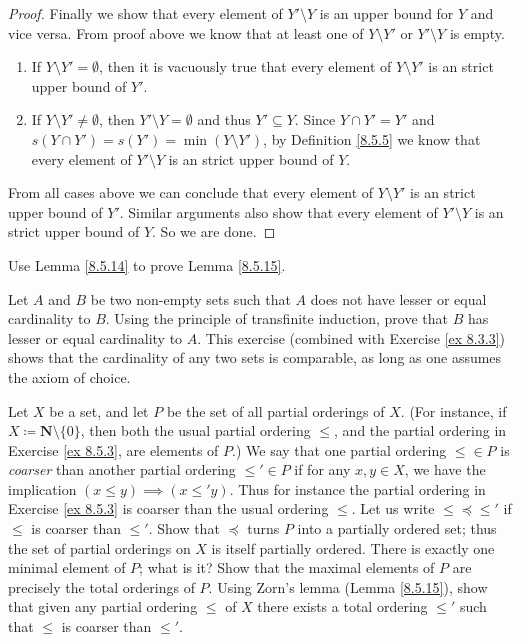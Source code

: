 \begin{proof}
    Finally we show that every element of \(Y' \setminus Y\) is an upper bound for \(Y\) and vice versa.
    From proof above we know that at least one of \(Y \setminus Y'\) or \(Y' \setminus Y\) is empty.
    \begin{enumerate}
        \item If \(Y \setminus Y' = \emptyset\), then it is vacuously true that every element of \(Y \setminus Y'\) is an strict upper bound of \(Y'\).
        \item If \(Y \setminus Y' \neq \emptyset\), then \(Y' \setminus Y = \emptyset\) and thus \(Y' \subseteq Y\).
              Since \(Y \cap Y' = Y'\) and \(s(Y \cap Y') = s(Y') = \min(Y \setminus Y')\), by Definition \ref{8.5.5} we know that every element of \(Y' \setminus Y\) is an strict upper bound of \(Y\).
    \end{enumerate}
    From all cases above we can conclude that every element of \(Y \setminus Y'\) is an strict upper bound of \(Y'\).
    Similar arguments also show that every element of \(Y' \setminus Y\) is an strict upper bound of \(Y\).
    So we are done.
\end{proof}

\begin{exercise}\label{ex 8.5.14}
    Use Lemma \ref{8.5.14} to prove Lemma \ref{8.5.15}.
\end{exercise}

\begin{exercise}\label{ex 8.5.15}
    Let \(A\) and \(B\) be two non-empty sets such that \(A\) does not have lesser or equal cardinality to \(B\).
    Using the principle of transfinite induction, prove that \(B\) has lesser or equal cardinality to \(A\).
    This exercise (combined with Exercise \ref{ex 8.3.3}) shows that the cardinality of any two sets is comparable, as long as one assumes the axiom of choice.
\end{exercise}

\begin{exercise}\label{ex 8.5.16}
    Let \(X\) be a set, and let \(P\) be the set of all partial orderings of \(X\).
    (For instance, if \(X \coloneqq \mathbf{N} \setminus \{0\}\), then both the usual partial ordering \(\leq\), and the partial ordering in Exercise \ref{ex 8.5.3}, are elements of \(P\).)
    We say that one partial ordering \(\leq \in P\) is \emph{coarser} than another partial ordering \(\leq' \in P\) if for any \(x, y \in X\), we have the implication \((x \leq y) \implies (x \leq' y)\).
    Thus for instance the partial ordering in Exercise \ref{ex 8.5.3} is coarser than the usual ordering \(\leq\).
    Let us write \(\leq \preceq \leq'\) if \(\leq\) is coarser than \(\leq'\).
    Show that \(\preceq\) turns \(P\) into a partially ordered set;
    thus the set of partial orderings on \(X\) is itself partially ordered.
    There is exactly one minimal element of \(P\);
    what is it?
    Show that the maximal elements of \(P\) are precisely the total orderings of \(P\).
    Using Zorn's lemma (Lemma \ref{8.5.15}), show that given any partial ordering \(\leq\) of \(X\) there exists a total ordering \(\leq'\) such that \(\leq\) is coarser than \(\leq'\).
\end{exercise}

